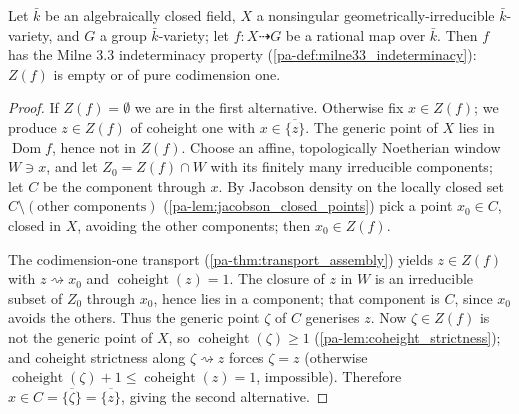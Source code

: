 \begin{theorem}
  \label{pa-thm:milne33_keystone}
  \leanok

  Let \(\bar k\) be an algebraically closed field, \(X\) a nonsingular
  geometrically-irreducible \(\bar k\)-variety, and \(G\) a group
  \(\bar k\)-variety; let \(f : X \dashrightarrow G\) be a rational map over
  \(\bar k\). Then \(f\) has the Milne 3.3 indeterminacy property
  (\ref{pa-def:milne33_indeterminacy}): \(Z(f)\) is empty or of pure codimension
  one.
\end{theorem}
\begin{proof}
  \leanok
  If \(Z(f) = \emptyset\) we are in the first alternative. Otherwise fix \(x \in
  Z(f)\); we produce \(z \in Z(f)\) of coheight one with \(x \in
  \overline{\{z\}}\). The generic point of \(X\) lies in \(\operatorname{Dom} f\),
  hence not in \(Z(f)\). Choose an affine, topologically Noetherian window
  \(W \ni x\), and let \(Z_0 = Z(f) \cap W\) with its finitely many irreducible
  components; let \(C\) be the component through \(x\). By Jacobson density on the
  locally closed set \(C \setminus (\text{other components})\)
  (\ref{pa-lem:jacobson_closed_points}) pick a point \(x_0 \in C\), closed in \(X\),
  avoiding the other components; then \(x_0 \in Z(f)\).

  The codimension-one transport (\ref{pa-thm:transport_assembly}) yields \(z \in
  Z(f)\) with \(z \rightsquigarrow x_0\) and \(\operatorname{coheight}(z) = 1\).
  The closure of \(z\) in \(W\) is an irreducible subset of \(Z_0\) through
  \(x_0\), hence lies in a component; that component is \(C\), since \(x_0\)
  avoids the others. Thus the generic point \(\zeta\) of \(C\) generises \(z\).
  Now \(\zeta \in Z(f)\) is not the generic point of \(X\), so
  \(\operatorname{coheight}(\zeta) \ge 1\) (\ref{pa-lem:coheight_strictness});
  and coheight strictness along \(\zeta \rightsquigarrow z\) forces \(\zeta = z\)
  (otherwise \(\operatorname{coheight}(\zeta) + 1 \le \operatorname{coheight}(z) =
  1\), impossible). Therefore \(x \in C = \overline{\{\zeta\}} =
  \overline{\{z\}}\), giving the second alternative.
\end{proof}

